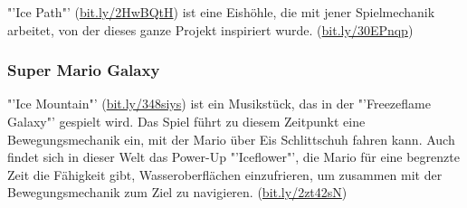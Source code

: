 \documentclass[a4paper,10pt,ngerman]{scrartcl}
\begin{document}
				"'Ice Path"' (\href{https://youtube.com/watch?v=riClBdyycM4}{bit.ly/2HwBQtH}) ist eine Eishöhle, die mit jener Spielmechanik arbeitet, von der dieses ganze Projekt inspiriert wurde. (\href{https://youtube.com/watch?v=erqrS-e-piA}{bit.ly/30EPnqp})
	
	
			\subsubsection{Super Mario Galaxy}
			
			"'Ice Mountain"' (\href{https://youtube.com/watch?v=9qnJWbEnKOs}{bit.ly/348siys}) ist ein Musikstück, das in der "'Freezeflame Galaxy"' gespielt wird. Das Spiel führt zu diesem Zeitpunkt eine Bewegungsmechanik ein, mit der Mario über Eis Schlittschuh fahren kann. Auch findet sich in dieser Welt das Power-Up "'Iceflower"', die Mario für eine begrenzte Zeit die Fähigkeit gibt, Wasseroberflächen einzufrieren, um zusammen mit der Bewegungsmechanik zum Ziel zu navigieren. (\href{https://youtube.com/watch?v=ImsaYCFMJns}{bit.ly/2zt42sN})
		
\end{document}
